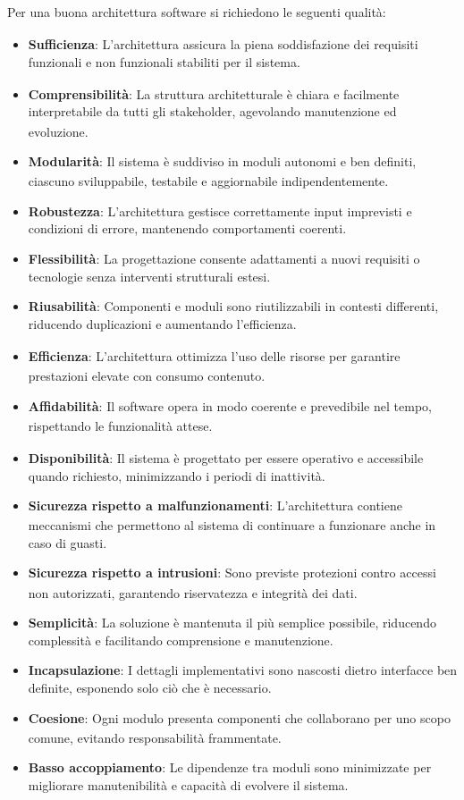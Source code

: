 \documentclass[a4paper,11pt]{article}
\newcommand{\G}{\textsubscript{\scalebox{0.6}{\textbf{G}}}}
\begin{document}
\subsubsubsection{Qualità\G{} dell'architettura}
Per una buona architettura software si richiedono le seguenti qualità\G{}:
\begin{itemize}
    \item \textbf{Sufficienza}: L'architettura assicura la piena soddisfazione dei requisiti funzionali\G{} e non funzionali\G{} stabiliti per il sistema.
    \item \textbf{Comprensibilità}: La struttura architetturale è chiara e facilmente interpretabile da tutti gli stakeholder\G{}, agevolando manutenzione ed evoluzione.
    \item \textbf{Modularità\G{}}: Il sistema è suddiviso in moduli autonomi e ben definiti, ciascuno sviluppabile, testabile e aggiornabile indipendentemente.
    \item \textbf{Robustezza}: L'architettura gestisce correttamente input imprevisti e condizioni di errore, mantenendo comportamenti coerenti.
    \item \textbf{Flessibilità}: La progettazione consente adattamenti a nuovi requisiti o tecnologie senza interventi strutturali estesi.
    \item \textbf{Riusabilità}: Componenti e moduli sono riutilizzabili in contesti differenti, riducendo duplicazioni e aumentando l'efficienza\G{}.
    \item \textbf{Efficienza\G{}}: L'architettura ottimizza l'uso delle risorse per garantire prestazioni elevate con consumo contenuto.
    \item \textbf{Affidabilità\G{}}: Il software opera in modo coerente e prevedibile nel tempo, rispettando le funzionalità\G{} attese.
    \item \textbf{Disponibilità}: Il sistema è progettato per essere operativo e accessibile quando richiesto, minimizzando i periodi di inattività.
    \item \textbf{Sicurezza\G{} rispetto a malfunzionamenti}: L'architettura contiene meccanismi che permettono al sistema di continuare a funzionare anche in caso di guasti.
    \item \textbf{Sicurezza\G{} rispetto a intrusioni}: Sono previste protezioni contro accessi non autorizzati, garantendo riservatezza e integrità dei dati.
    \item \textbf{Semplicità}: La soluzione è mantenuta il più semplice possibile, riducendo complessità e facilitando comprensione e manutenzione.
    \item \textbf{Incapsulazione}: I dettagli implementativi sono nascosti dietro interfacce ben definite, esponendo solo ciò che è necessario.
    \item \textbf{Coesione}: Ogni modulo\G{} presenta componenti che collaborano per uno scopo comune, evitando responsabilità frammentate.
    \item \textbf{Basso accoppiamento}: Le dipendenze tra moduli sono minimizzate per migliorare manutenibilità\G{} e capacità di evolvere il sistema.
\end{itemize}
\end{document}
